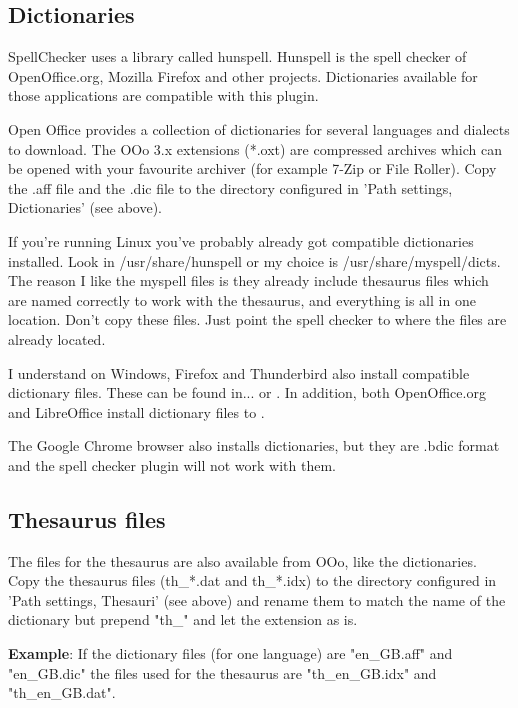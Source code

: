 \subsection{Dictionaries}

SpellChecker uses a library called hunspell. Hunspell is the spell checker of OpenOffice.org, Mozilla Firefox and other projects. Dictionaries available for those applications are compatible with this plugin.

Open Office provides a collection of dictionaries for several languages and dialects to download. The OOo 3.x extensions (*.oxt) are compressed archives which can be opened with your favourite archiver (for example 7-Zip or File Roller). Copy the .aff file and the .dic file to the directory configured in 'Path settings, Dictionaries' (see above).

If you're running Linux you've probably already got compatible dictionaries installed. Look in /usr/share/hunspell or my choice is /usr/share/myspell/dicts. The reason I like the myspell files is they already include thesaurus files which are named correctly to work with the thesaurus, and everything is all in one location. Don't copy these files. Just point the spell checker to where the files are already located.

I understand on Windows, Firefox and Thunderbird also install compatible dictionary files. These can be found in...  or . In addition, both OpenOffice.org and LibreOffice install dictionary files to\newline
 .

The Google Chrome browser also installs dictionaries, but they are .bdic format and the \codeblocks spell checker plugin will not work with them.

\subsection{Thesaurus files}

The files for the thesaurus are also available from OOo, like the dictionaries. Copy the thesaurus files (th\_*.dat and th\_*.idx) to the directory configured in 'Path settings, Thesauri' (see above) and rename them to match the name of the dictionary but prepend "th\_" and let the extension as is.

\textbf{Example}: If the dictionary files (for one language) are "en\_GB.aff" and "en\_GB.dic" the files used for the thesaurus are "th\_en\_GB.idx" and "th\_en\_GB.dat".

